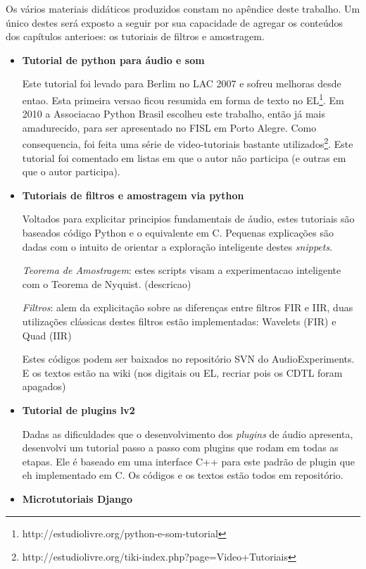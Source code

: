 Os vários materiais didáticos produzidos constam no apêndice
deste trabalho. Um único destes será exposto a seguir por sua
capacidade de agregar os conteúdos dos capítulos anterioes:
os tutoriais de filtros e amostragem.

\begin{itemize}
    \item {\bf Tutorial de python para áudio e som}

Este tutorial foi levado para Berlim no LAC 2007 e sofreu melhoras desde entao. Esta
primeira versao ficou resumida em forma de texto no EL\footnote{http://estudiolivre.org/python-e-som-tutorial}. Em 2010
a Associacao Python Brasil escolheu este trabalho, então já mais amadurecido, para ser apresentado no
FISL em Porto Alegre. Como consequencia, foi feita uma série de video-tutoriais bastante utilizados\footnote{http://estudiolivre.org/tiki-index.php?page=Video+Tutoriais}.
Este tutorial foi comentado em listas em que o autor não participa (e outras em que o autor participa).

    \item {\bf Tutoriais de filtros e amostragem via python}

Voltados para explicitar principios fundamentais de áudio, estes tutoriais
são baseados código Python e o equivalente em C. Pequenas explicações são
dadas com o intuito de orientar a exploração inteligente destes \emph{snippets}.

\emph{Teorema de Amostragem}: estes scripts visam a experimentacao inteligente com
o Teorema de Nyquist. (descricao)

\emph{Filtros}: alem da explicitação sobre as diferenças entre filtros FIR e IIR,
duas utilizações clássicas destes filtros estão implementadas: Wavelets (FIR) e Quad (IIR)

Estes códigos podem ser baixados no repositório SVN do AudioExperiments. E os textos estão
na wiki (nos digitais ou EL, recriar pois os CDTL foram apagados)

    \item {\bf Tutorial de plugins lv2}

Dadas as dificuldades que o desenvolvimento dos \emph{plugins} de áudio apresenta,
desenvolvi um tutorial passo a passo com plugins que rodam em todas as etapas.
Ele é baseado em uma interface C++ para este padrão de plugin que eh implementado
em C. Os códigos e os textos estão todos em repositório.

    \item {\bf Microtutoriais Django ~\cite{dmicrotuts}}


\end{itemize}

